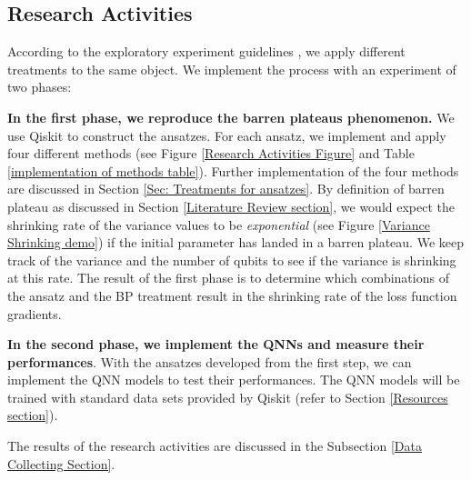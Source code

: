 \subsection{Research Activities} \label{Research Activities section}
According to the exploratory experiment guidelines \cite{oivoSoftwareEngineeringResearch2004}, we apply different treatments to the same object.
We implement the process with an experiment of two phases:

\textbf{In the first phase, we reproduce the barren plateaus phenomenon.}
We use Qiskit \cite{Qiskit} to construct the ansatzes.
For each ansatz, we implement and apply four different methods (see Figure \ref{Research Activities Figure} and Table \ref{implementation of methods table}).
Further implementation of the four methods are discussed in Section \ref{Sec: Treatments for ansatzes}.
By definition of barren plateau as discussed in Section \ref{Literature Review section}, we would expect the shrinking rate of the variance values to be \textit{exponential} (see Figure \ref{Variance Shrinking demo}) if the initial parameter has landed in a barren plateau.
We keep track of the variance and the number of qubits to see if the variance is shrinking at this rate.
The result of the first phase is to determine which combinations of the ansatz and the BP treatment result in the shrinking rate of the loss function gradients.

\textbf{In the second phase, we implement the QNNs and measure their performances}.
With the ansatzes developed from the first step, we can implement the QNN models to test their performances.
The QNN models will be trained with standard data sets provided by Qiskit (refer to Section \ref{Resources section}).

The results of the research activities are discussed in the Subsection \ref{Data Collecting Section}.

